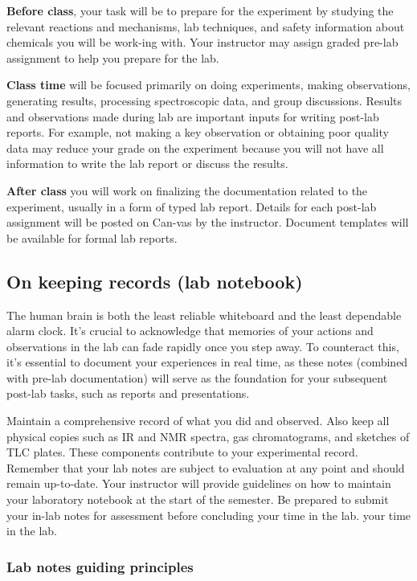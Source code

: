\textbf{Before class}, your task will be to prepare for the experiment
by studying the relevant reactions and mechanisms, lab techniques, and
safety information about chemicals you will be work-ing with. Your
instructor may assign graded pre-lab assignment to help you prepare for
the lab.

\textbf{Class time} will be focused primarily on doing experiments,
making observations, generating results, processing spectroscopic data,
and group discussions. Results and observations made during lab are
important inputs for writing post-lab reports. For example, not making a
key observation or obtaining poor quality data may reduce your grade on
the experiment because you will not have all information to write the
lab report or discuss the results.

\textbf{After class} you will work on finalizing the documentation
related to the experiment, usually in a form of typed lab report.
Details for each post-lab assignment will be posted on Can-vas by the
instructor. Document templates will be available for formal lab reports.

\subsection{On keeping records (lab
notebook)}\label{on-keeping-records-lab-notebook}

The human brain is both the least reliable whiteboard and the least
dependable alarm clock. It's crucial to acknowledge that memories of
your actions and observations in the lab can fade rapidly once you step
away. To counteract this, it's essential to document your experiences in
real time, as these notes (combined with pre-lab documentation) will
serve as the foundation for your subsequent post-lab tasks, such as
reports and presentations.

Maintain a comprehensive record of what you did and observed. Also keep
all physical copies such as IR and NMR spectra, gas chromatograms, and
sketches of TLC plates. These components contribute to your experimental
record. Remember that your lab notes are subject to evaluation at any
point and should remain up-to-date. Your instructor will provide
guidelines on how to maintain your laboratory notebook at the start of
the semester. Be prepared to submit your in-lab notes for assessment
before concluding your time in the lab. your time in the lab.

\subsubsection{Lab notes guiding
principles}\label{lab-notes-guiding-principles}

